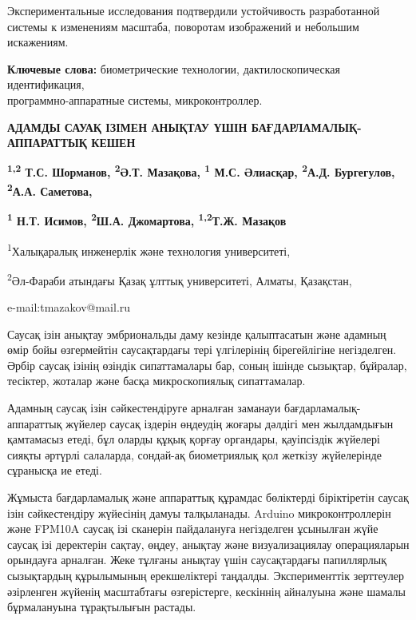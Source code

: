 Экспериментальные исследования подтвердили устойчивость разработанной
системы к изменениям масштаба, поворотам изображений и небольшим
искажениям.

{\bfseries Ключевые слова:} биометрические технологии, дактилоскопическая
идентификация, \\программно-аппаратные системы, микроконтроллер.

\begin{articleheader}
{\bfseries АДАМДЫ САУАҚ ІЗІМЕН АНЫҚТАУ ҮШІН БАҒДАРЛАМАЛЫҚ-АППАРАТТЫҚ КЕШЕН}

{\bfseries \textsuperscript{1,2} Т.С. Шорманов, \textsuperscript{2}Ә.Т.
Мазақова, \textsuperscript{1} М.С. Әлиасқар, \textsuperscript{2}А.Д.
Бургегулов, \textsuperscript{2}А.А. Саметова,}

{\bfseries \textsuperscript{1} Н.Т. Исимов, \textsuperscript{2}Ш.А.
Джомартова, \textsuperscript{1,2}Т.Ж. Мазақов\textsuperscript{\envelope }}
\end{articleheader}

\begin{affiliation}
\textsuperscript{1}Халықаралық инженерлік және технология университеті,

\textsuperscript{2}Әл-Фараби атындағы Қазақ ұлттық университеті, Алматы,
Қазақстан,

e-mail:tmazakov@mail.ru
\end{affiliation}

Саусақ ізін анықтау эмбриональды даму кезінде қалыптасатын және адамның
өмір бойы өзгермейтін саусақтардағы тері үлгілерінің бірегейлігіне
негізделген. Әрбір саусақ ізінің өзіндік сипаттамалары бар, соның ішінде
сызықтар, бұйралар, тесіктер, жоталар және басқа микроскопиялық
сипаттамалар.

Адамның саусақ ізін сәйкестендіруге арналған заманауи
бағдарламалық-аппараттық жүйелер саусақ іздерін өңдеудің жоғары дәлдігі
мен жылдамдығын қамтамасыз етеді, бұл оларды құқық қорғау органдары,
қауіпсіздік жүйелері сияқты әртүрлі салаларда, сондай-ақ биометриялық
қол жеткізу жүйелерінде сұранысқа ие етеді.

Жұмыста бағдарламалық және аппараттық құрамдас бөліктерді біріктіретін
саусақ ізін сәйкестендіру жүйесінің дамуы талқыланады. Arduino
микроконтроллерін және FPM10A саусақ ізі сканерін пайдалануға
негізделген ұсынылған жүйе саусақ ізі деректерін сақтау, өңдеу, анықтау
және визуализациялау операцияларын орындауға арналған. Жеке тұлғаны
анықтау үшін саусақтардағы папиллярлық сызықтардың құрылымының
ерекшеліктері таңдалды. Эксперименттік зерттеулер әзірленген жүйенің
масштабтағы өзгерістерге, кескіннің айналуына және шамалы бұрмалануына
тұрақтылығын растады.

